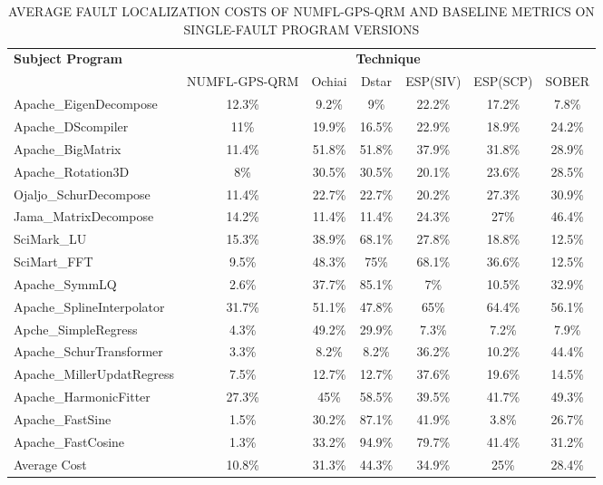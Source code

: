 \documentclass[times]{stvrauth}
\begin{document}
\begin{table}[htbp!]
\fontsize{8pt}{9pt}\selectfont
\centering
\caption{AVERAGE FAULT LOCALIZATION COSTS OF NUMFL-GPS-QRM AND BASELINE METRICS ON SINGLE-FAULT PROGRAM VERSIONS}
\label{table2}
      \begin{tabular}{|l|c|c|c|c|c|c|}
      \hline
\multirow{2}{*}{{\bf Subject Program}}	&	\multicolumn{6}{|c|}{{\bf Technique}}	\\	\cline{2-7}
&{NUMFL-GPS-QRM}	&{ Ochiai}&	{ Dstar}&	{ ESP(SIV)} &	{ ESP(SCP)}	&{SOBER} \\\hline
Apache\_EigenDecompose	&	12.3\%	&	9.2\%	&	9\%	&	22.2\%	&	17.2\%	&	7.8\%	\\	\hline
Apache\_DScompiler	&	11\%	&	19.9\%	&	16.5\%	&	22.9\%	&	18.9\%	&	24.2\%	\\	\hline
Apache\_BigMatrix	&	11.4\%	&	51.8\%	&	51.8\%	&	37.9\%	&	31.8\%	&	28.9\%	\\	\hline
Apache\_Rotation3D	&	8\%	&	30.5\%	&	30.5\%	&	20.1\%	&	23.6\%	&	28.5\%	\\	\hline
Ojaljo\_SchurDecompose	&	11.4\%	&	22.7\%	&	22.7\%	&	20.2\%	&	27.3\%	&	30.9\%	\\	\hline
Jama\_MatrixDecompose	&	14.2\%	&	11.4\%	&	11.4\%	&	24.3\%	&	27\%	&	46.4\%	\\	\hline
SciMark\_LU	&	15.3\%	&	38.9\%	&	68.1\%	&	27.8\%	&	18.8\%	&	12.5\%	\\	\hline
SciMart\_FFT	&	9.5\%	&	48.3\%	&	75\%	&	68.1\%	&	36.6\%	&	12.5\%	\\	\hline
Apache\_SymmLQ	&	2.6\%	&	37.7\%	&	85.1\%	&	7\%	&	10.5\%	&	32.9\%	\\	\hline
Apache\_SplineInterpolator	&	31.7\%	&	51.1\%	&	47.8\%	&	65\%	&	64.4\%	&	56.1\%	\\	\hline
Apche\_SimpleRegress	&	4.3\%	&	49.2\%	&	29.9\%	&	7.3\%	&	7.2\%	&	7.9\%	\\	\hline
Apache\_SchurTransformer	&	3.3\%	&	8.2\%	&	8.2\%	&	36.2\%	&	10.2\%	&	44.4\%	\\	\hline
Apache\_MillerUpdatRegress	&	7.5\%	&	12.7\%	&	12.7\%	&	37.6\%	&	19.6\%	&	14.5\%	\\	\hline
Apache\_HarmonicFitter	&	27.3\%	&	45\%	&	58.5\%	&	39.5\%	&	41.7\%	&	49.3\%	\\	\hline
Apache\_FastSine	&	1.5\%	&	30.2\%	&	87.1\%	&	41.9\%	&	3.8\%	&	26.7\%	\\	\hline
Apache\_FastCosine	&	1.3\%	&	33.2\%	&	94.9\%	&	79.7\%	&	41.4\%	&	31.2\%	\\	\hline
Average Cost	&	10.8\%	&	31.3\%	&	44.3\%	&	34.9\%	&	25\%	&	28.4\%	\\	\hline
\end{tabular}
\end{table}
\end{document}
